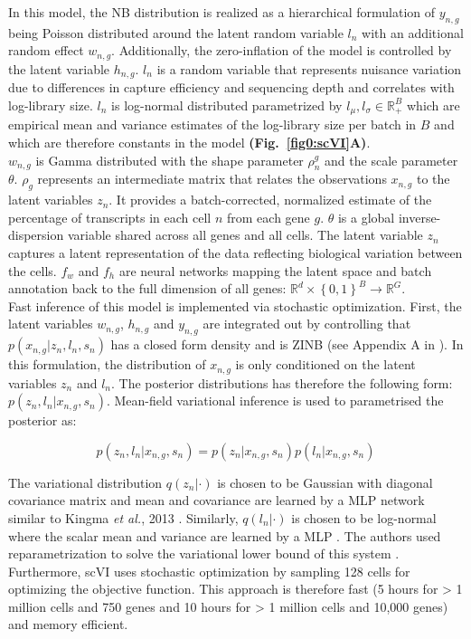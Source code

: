 \vspace{1cm}

In this model, the NB distribution is realized as a hierarchical formulation of $y_{n,g}$ being Poisson distributed around the latent random variable $l_n$ with an additional random effect $w_{n,g}$. Additionally, the zero-inflation of the model is controlled by the latent variable $h_{n,g}$. $l_n$ is a random variable that represents nuisance variation due to differences in capture efficiency and sequencing depth and correlates with log-library size. $l_n$ is log-normal distributed parametrized by $l_\mu,l_\sigma\in\mathbb{R}^B_+$ which are empirical mean and variance estimates of the log-library size per batch in $B$ and which are therefore constants in the model \textbf{(Fig.~\ref{fig0:scVI}A)}.\\

$w_{n,g}$ is Gamma distributed with the shape parameter $\rho_n^g$ and the scale parameter $\theta$. $\rho_g$ represents an intermediate matrix that relates the observations $x_{n,g}$ to the latent variables $z_n$. It provides a batch-corrected, normalized estimate of the percentage of transcripts in each cell $n$ from each gene $g$. $\theta$ is a global inverse-dispersion variable shared across all genes and all cells. The latent variable $z_n$ captures a latent representation of the data reflecting biological variation between the cells. $f_w$ and $f_h$ are neural networks mapping the latent space and batch annotation back to the full dimension of all genes: $\mathbb{R}^d\times{}\left\lbrace0,1\right\rbrace^B\rightarrow\mathbb{R}^G$.\\

Fast inference of this model is implemented via stochastic optimization. First, the latent variables $w_{n,g}$, $h_{n,g}$ and $y_{n,g}$ are integrated out by controlling that $p(x_{n,g}|z_n,l_n,s_n)$ has a closed form density and is ZINB (see Appendix A in \citep{Lopez2018}). In this formulation, the distribution of $x_{n,g}$ is only conditioned on the latent variables $z_n$ and $l_n$. The posterior distributions has therefore the following form: $p(z_n,l_n|x_{n,g},s_n)$. Mean-field variational inference is used to parametrised the posterior as:

\begin{equation}
p(z_n,l_n|x_{n,g},s_n)=p(z_n|x_{n,g},s_n)p(l_n|x_{n,g},s_n)
\end{equation} 

The variational distribution $q(z_n|\cdot)$ is chosen to be Gaussian with diagonal covariance matrix and mean and covariance are learned by a \gls{MLP} network similar to Kingma \emph{et al.}, 2013 \citep{Kingma2013}. Similarly, $q(l_n|\cdot)$ is chosen to be log-normal where the scalar mean and variance are learned by a MLP \citep{Kingma2013}. The authors used reparametrization to solve the variational lower bound of this system \cite{Lopez2018, Kingma2013}. Furthermore, scVI uses stochastic optimization by sampling 128 cells for optimizing the objective function. This approach is therefore fast (5 hours for > 1 million cells and 750 genes and 10 hours for > 1 million cells and 10,000 genes) and memory efficient. \\

